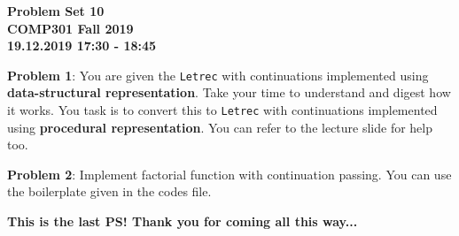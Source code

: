 \documentclass[12pt,reqno]{amsart}
\newcommand{\code}[1]{\texttt{#1}}
\begin{document}
\thispagestyle{empty}
\begin{center}
\large\textbf{Problem Set 10 \\ COMP301 Fall 2019} \\
\normalsize\textbf{19.12.2019 17:30 - 18:45} \\
\end{center}

\vspace{7.5mm}

\textbf{Problem 1}: You are given the \code{Letrec} with continuations implemented using \textbf{data-structural representation}. Take your time to understand and digest how it works. You task is to convert this to \code{Letrec} with continuations implemented using \textbf{procedural representation}. You can refer to the lecture slide for help too.

\vspace{7.5mm}

\textbf{Problem 2}: Implement factorial function with continuation passing. You can use the boilerplate given in the codes file.

\vfill

\textbf{This is the last PS! Thank you for coming all this way...}
\end{document}
